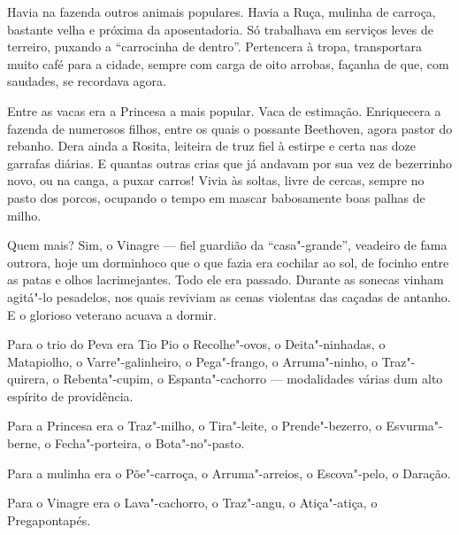 Havia na fazenda outros animais populares. Havia a Ruça, mulinha de
carroça, bastante velha e próxima da aposentadoria. Só trabalhava em
serviços leves de terreiro, puxando a ``carrocinha de dentro''.
Pertencera à tropa, transportara muito café para a cidade, sempre com
carga de oito arrobas, façanha de que, com saudades, se recordava agora.

Entre as vacas era a Princesa a mais popular. Vaca de estimação.
Enriquecera a fazenda de numerosos filhos, entre os quais o possante
Beethoven, agora pastor do rebanho. Dera ainda a Rosita, leiteira de
truz fiel à estirpe e certa nas doze garrafas diárias. E quantas outras
crias que já andavam por sua vez de bezerrinho novo, ou na canga, a
puxar carros! Vivia às soltas, livre de cercas, sempre no pasto dos
porcos, ocupando o tempo em mascar babosamente boas palhas de milho.

Quem mais? Sim, o Vinagre --- fiel guardião da ``casa"-grande'', veadeiro
de fama outrora, hoje um dorminhoco que o que fazia era cochilar ao sol,
de focinho entre as patas e olhos lacrimejantes. Todo ele era passado.
Durante as sonecas vinham agitá"-lo pesadelos, nos quais reviviam as
cenas violentas das caçadas de antanho. E o glorioso veterano acuava a
dormir.



Para o trio do Peva era Tio Pio o Recolhe"-ovos, o Deita"-ninhadas, o
Matapiolho, o Varre"-galinheiro, o Pega"-frango, o Arruma"-ninho, o
Traz"-quirera, o Rebenta"-cupim, o Espanta"-cachorro --- modalidades várias
dum alto espírito de providência.

Para a Princesa era o Traz"-milho, o Tira"-leite, o Prende"-bezerro, o
Esvurma"-berne, o Fecha"-porteira, o Bota"-no"-pasto.

Para a mulinha era o Põe"-carroça, o Arruma"-arreios, o Escova"-pelo, o
Daração.

Para o Vinagre era o Lava"-cachorro, o Traz"-angu, o Atiça"-atiça, o
Pregapontapés.

